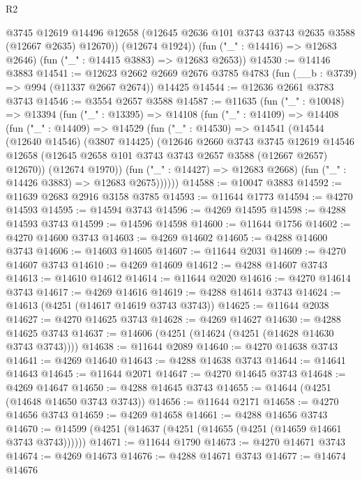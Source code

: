 \begin{lexlean}{R2}
\begin{coremodule}
          @3745
          @12619
          @14496
          @12658
          (@12645 @2636 @101 @3743 @3743 @2635 @3588 (@12667 @2635) @12670))
        (@12674 @1924))
      (fun ("_" : @14416) => @12683 @2646)
      (fun ("_" : @14415 @3883) => @12683 @2653))
@14530 := @14146 @3883
@14541 := @12623
    @2662
    @2669
    @2676
    @3785
    @4783
    (fun (__b : @3739) => @994 (@11337 @2667 @2674))
    @14425
@14544 := @12636 @2661 @3783 @3743
@14546 := @3554 @2657 @3588
@14587 := @11635
    (fun ("_" : @10048) =>
    @13394
      (fun ("_" : @13395) =>
      @14108
        (fun ("_" : @14109) =>
        @14408
          (fun ("_" : @14409) =>
          @14529
            (fun ("_" : @14530) =>
            @14541
              (@14544
                (@12640 @14546)
                (@3807 @14425)
                (@12646
                  @2660
                  @3743
                  @3745
                  @12619
                  @14546
                  @12658
                  (@12645 @2658 @101 @3743 @3743 @2657 @3588 (@12667 @2657) @12670))
                (@12674 @1970))
              (fun ("_" : @14427) => @12683 @2668)
              (fun ("_" : @14426 @3883) => @12683 @2675))))))
@14588 := @10047 @3883
@14592 := @11639 @2683 @2916 @3158 @3785
@14593 := @11644 @1773
@14594 := @4270 @14593
@14595 := @14594 @3743
@14596 := @4269 @14595
@14598 := @4288 @14593 @3743
@14599 := @14596 @14598
@14600 := @11644 @1756
@14602 := @4270 @14600 @3743
@14603 := @4269 @14602
@14605 := @4288 @14600 @3743
@14606 := @14603 @14605
@14607 := @11644 @2031
@14609 := @4270 @14607 @3743
@14610 := @4269 @14609
@14612 := @4288 @14607 @3743
@14613 := @14610 @14612
@14614 := @11644 @2020
@14616 := @4270 @14614 @3743
@14617 := @4269 @14616
@14619 := @4288 @14614 @3743
@14624 := @14613 (@4251 (@14617 @14619 @3743 @3743))
@14625 := @11644 @2038
@14627 := @4270 @14625 @3743
@14628 := @4269 @14627
@14630 := @4288 @14625 @3743
@14637 := @14606 (@4251 (@14624 (@4251 (@14628 @14630 @3743 @3743))))
@14638 := @11644 @2089
@14640 := @4270 @14638 @3743
@14641 := @4269 @14640
@14643 := @4288 @14638 @3743
@14644 := @14641 @14643
@14645 := @11644 @2071
@14647 := @4270 @14645 @3743
@14648 := @4269 @14647
@14650 := @4288 @14645 @3743
@14655 := @14644 (@4251 (@14648 @14650 @3743 @3743))
@14656 := @11644 @2171
@14658 := @4270 @14656 @3743
@14659 := @4269 @14658
@14661 := @4288 @14656 @3743
@14670 := @14599 (@4251 (@14637 (@4251 (@14655 (@4251 (@14659 @14661 @3743 @3743))))))
@14671 := @11644 @1790
@14673 := @4270 @14671 @3743
@14674 := @4269 @14673
@14676 := @4288 @14671 @3743
@14677 := @14674 @14676

\end{coremodule}
\end{lexlean}
